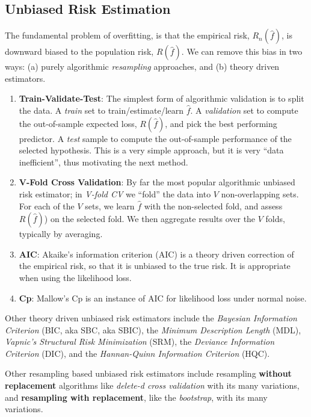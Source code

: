 \documentclass[]{book}
\theoremstyle{definition}
\theoremstyle{definition}
\theoremstyle{definition}
\theoremstyle{remark}
\begin{document}
\subsection{Unbiased Risk Estimation}\label{unbiased-risk-estimation}

The fundamental problem of overfitting, is that the empirical risk,
\(R_n(\hat f)\), is downward biased to the population risk,
\(R(\hat f)\). We can remove this bias in two ways: (a) purely
algorithmic \emph{resampling} approaches, and (b) theory driven
estimators.

\begin{enumerate}
\def\labelenumi{\arabic{enumi}.}
\item
  \textbf{Train-Validate-Test}: The simplest form of algorithmic
  validation is to split the data. A \emph{train} set to
  train/estimate/learn \(\hat f\). A \emph{validation} set to compute
  the out-of-sample expected loss, \(R(\hat f)\), and pick the best
  performing predictor. A \emph{test} sample to compute the
  out-of-sample performance of the selected hypothesis. This is a very
  simple approach, but it is very ``data inefficient'', thus motivating
  the next method.
\item
  \textbf{V-Fold Cross Validation}: By far the most popular algorithmic
  unbiased risk estimator; in \emph{V-fold CV} we ``fold'' the data into
  \(V\) non-overlapping sets. For each of the \(V\) sets, we learn
  \(\hat f\) with the non-selected fold, and assess \(R(\hat f)\)) on
  the selected fold. We then aggregate results over the \(V\) folds,
  typically by averaging.
\item
  \textbf{AIC}: Akaike's information criterion (AIC) is a theory driven
  correction of the empirical risk, so that it is unbiased to the true
  risk. It is appropriate when using the likelihood loss.
\item
  \textbf{Cp}: Mallow's Cp is an instance of AIC for likelihood loss
  under normal noise.
\end{enumerate}

Other theory driven unbiased risk estimators include the \emph{Bayesian
Information Criterion} (BIC, aka SBC, aka SBIC), the \emph{Minimum
Description Length} (MDL), \emph{Vapnic's Structural Risk Minimization}
(SRM), the \emph{Deviance Information Criterion} (DIC), and the
\emph{Hannan-Quinn Information Criterion} (HQC).

Other resampling based unbiased risk estimators include resampling
\textbf{without replacement} algorithms like \emph{delete-d cross
validation} with its many variations, and \textbf{resampling with
replacement}, like the \emph{bootstrap}, with its many variations.
\end{document}
